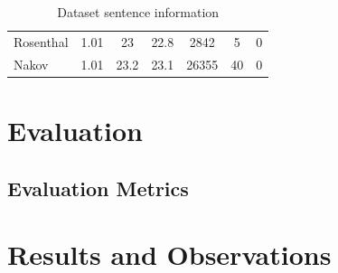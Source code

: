 \documentclass[12pt, a4paper]{report}
\theoremstyle{definition}
\theoremstyle{definition}%
\theoremstyle{definition}%
\theoremstyle{definition}%
\theoremstyle{definition}%
\theoremstyle{definition}%
\renewcommand{\cite}[1]{[\citealp{#1}]}
\begin{document}
\begin{table}[]
\begin{tabular}{|l|c|cc|ccc|}
Rosenthal                         & 1.01                                                                                          & 23                    & 22.8                  & 2842                             & 5                               & 0                                \\ 
Nakov                             & 1.01                                                                                          & 23.2                  & 23.1                  & 26355                            & 40                              & 0                                \\ \hline
\end{tabular}
\caption{Dataset sentence information}
\label{tab:dataset_sentence_info}
\end{table}


\chapter{Evaluation}

\section{Evaluation Metrics}

\chapter{Results and Observations}
\end{document}
